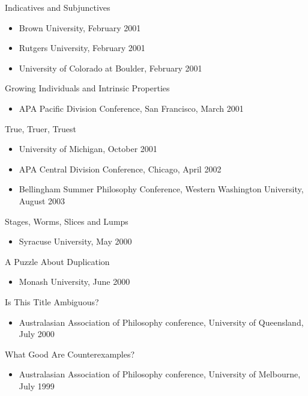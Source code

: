 \documentclass[
  10pt,
  letterpaper,
  DIV=11,
  numbers=noendperiod,
  twoside]{scrartcl}
\providecommand{\tightlist}{%
  \setlength{\itemsep}{0pt}\setlength{\parskip}{0pt}}
\begin{document}
Indicatives and Subjunctives

\begin{itemize}
\tightlist
\item
  Brown University, February 2001
\item
  Rutgers University, February 2001
\item
  University of Colorado at Boulder, February 2001
\end{itemize}

Growing Individuals and Intrinsic Properties

\begin{itemize}
\tightlist
\item
  APA Pacific Division Conference, San Francisco, March 2001
\end{itemize}

True, Truer, Truest

\begin{itemize}
\tightlist
\item
  University of Michigan, October 2001
\item
  APA Central Division Conference, Chicago, April 2002
\item
  Bellingham Summer Philosophy Conference, Western Washington
  University, August 2003
\end{itemize}

Stages, Worms, Slices and Lumps

\begin{itemize}
\tightlist
\item
  Syracuse University, May 2000
\end{itemize}

A Puzzle About Duplication

\begin{itemize}
\tightlist
\item
  Monash University, June 2000
\end{itemize}

Is This Title Ambiguous?

\begin{itemize}
\tightlist
\item
  Australasian Association of Philosophy conference, University of
  Queensland, July 2000
\end{itemize}

What Good Are Counterexamples?

\begin{itemize}
\tightlist
\item
  Australasian Association of Philosophy conference, University of
  Melbourne, July 1999
\end{itemize}
\end{document}
